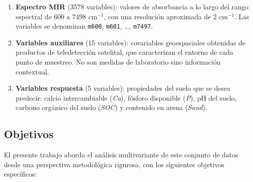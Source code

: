 \documentclass[12pt, a4paper]{article}
\begin{document}
\begin{enumerate}
  \item \textbf{Espectro MIR} (3578 variables): valores de absorbancia a lo largo del
        rango espectral de 600 a 7498 cm$^{-1}$, con una resolución aproximada de
        2 cm$^{-1}$. Las variables se denominan \texttt{m600}, \texttt{m601}, \ldots,
        \texttt{m7497}.

  \item \textbf{Variables auxiliares} (15 variables): covariables geoespaciales obtenidas
        de productos de teledetección satelital, que caracterizan el entorno de cada
        punto de muestreo. No son medidas de laboratorio sino información contextual.

  \item \textbf{Variables respuesta} (5 variables): propiedades del suelo que se desea
        predecir: calcio intercambiable (\textit{Ca}), fósforo disponible (\textit{P}),
        pH del suelo, carbono orgánico del suelo (\textit{SOC}) y contenido en arena
        (\textit{Sand}).
\end{enumerate}

\subsection{Objetivos}

El presente trabajo aborda el análisis multivariante de este conjunto de datos desde una
perspectiva metodológica rigurosa, con los siguientes objetivos específicos:
\end{document}
